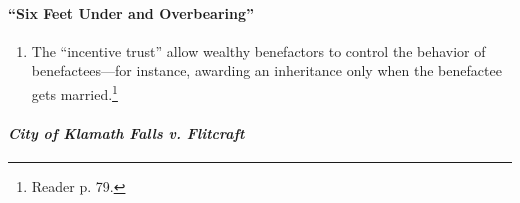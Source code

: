 \paragraph{``Six Feet Under and Overbearing''}
\begin{enumerate}
    \item The ``incentive trust'' allow wealthy benefactors to control the 
    behavior of benefactees---for instance, awarding an inheritance only when 
    the benefactee gets married.\footnote{Reader p. 79.}
\end{enumerate}

\paragraph{\emph{City of Klamath Falls v. Flitcraft}}

